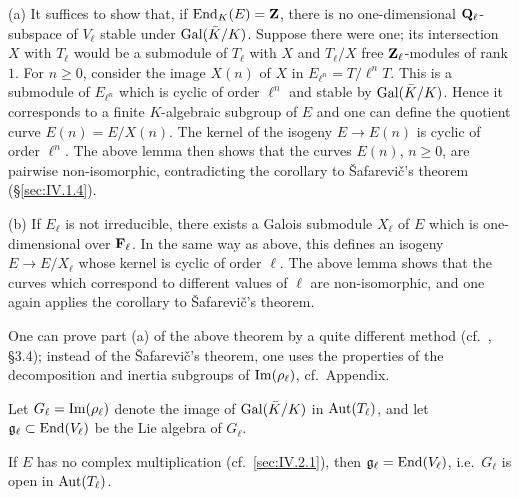 
(a) It suffices to show that, if $\mathrm{End}_K(E) = \mathbf{Z}$, there is no
one-dimensional $\mathbf{Q}_\ell$-subspace of $V_\ell$ stable under
$\mathrm{Gal}(\bar{K}/K)$.  Suppose there were one; its intersection $X$ with
$T_\ell$ would be a submodule of $T_\ell$ with $X$ and $T_\ell/X$ free
$\mathbf{Z}_\ell$-modules of rank $1$.  For $n \geq 0$, consider the image $X(n)$
of $X$ in $E_{\ell^n} = T/\ell^n T$.  This is a submodule of
$E_{\ell^n}$ which is cyclic of order $\ell^n$ and stable by
$\mathrm{Gal}(\bar{K}/K)$.  Hence it corresponds to a finite $K$-algebraic
subgroup of $E$ and one can define the quotient curve
$E(n) = E/X(n)$.  The kernel of the isogeny $E \to E(n)$ is cyclic of
order $\ell^n$.  The above lemma then shows that the curves $E(n)$,
$n \geq 0$, are pairwise non-isomorphic, contradicting the corollary to
\v{S}afarevi\v{c}'s theorem (\S\ref{sec:IV.1.4}).

(b) If $E_\ell$ is not irreducible, there exists a Galois submodule
$X_\ell$ of $E$ which is one-dimensional over $\mathbf{F}_\ell$.  In the same way
as above, this defines an isogeny $E \to E/X_\ell$ whose kernel is cyclic
of order $\ell$.  The above lemma shows that the curves which correspond
to different values of $\ell$ are non-isomorphic, and one again applies
the corollary to \v{S}afarevi\v{c}'s theorem.


One can prove part (a) of the above theorem by a quite different method
(cf.~\cite{serre-lieg}, \S3.4); instead of the \v{S}afarevi\v{c}'s
theorem, one uses the properties of the decomposition and inertia
subgroups of $\mathrm{Im}(\rho_\ell)$, cf.~Appendix.


Let $G_\ell = \mathrm{Im}(\rho_\ell)$ denote the image of $\mathrm{Gal}(\bar{K}/K)$ in
$\mathrm{Aut}(T_\ell)$, and let $\mathfrak{g}_\ell \subset \mathrm{End}(V_\ell)$ be the
Lie algebra of $G_\ell$.

\begin{theorem}\label{thm:IV.2.2.1}
If $E$ has no complex multiplication (cf.~\ref{sec:IV.2.1}), then
$\mathfrak{g}_\ell = \mathrm{End}(V_\ell)$, i.e.~$G_\ell$ is open in
$\mathrm{Aut}(T_\ell)$.
\end{theorem}

